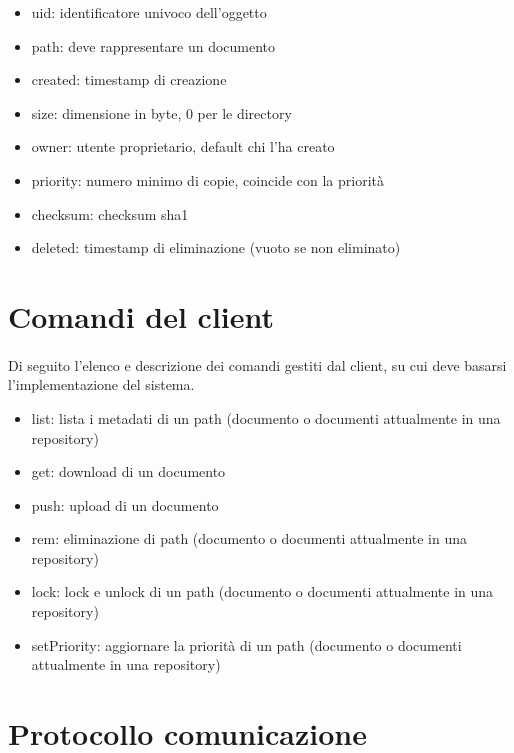 \documentclass{article}
\begin{document}
\begin{itemize}
	\item uid: identificatore univoco dell'oggetto
	\item path: deve rappresentare un documento
	\item created: timestamp di creazione
	\item size: dimensione in byte, 0 per le directory
	\item owner: utente proprietario, default chi l'ha creato
	\item priority: numero minimo di copie, coincide con la priorità 
	\item checksum: checksum sha1
	\item deleted: timestamp di eliminazione (vuoto se non eliminato)
\end{itemize}


\section{Comandi del client}

\paragraph{} Di seguito l'elenco e descrizione dei comandi gestiti dal client, su cui deve basarsi l'implementazione del sistema.

\begin{itemize}
	\item list: lista i metadati di un path (documento o documenti attualmente in una repository)
	
	\item get: download di un documento
	
	\item push: upload di un documento
	
	\item rem: eliminazione di path (documento o documenti attualmente in una repository)
	
	\item lock: lock e unlock di un path (documento o documenti attualmente in una repository)
	
	\item setPriority: aggiornare la priorità di un path (documento o documenti attualmente in una repository)
\end{itemize}


\section{Protocollo comunicazione}
\end{document}
